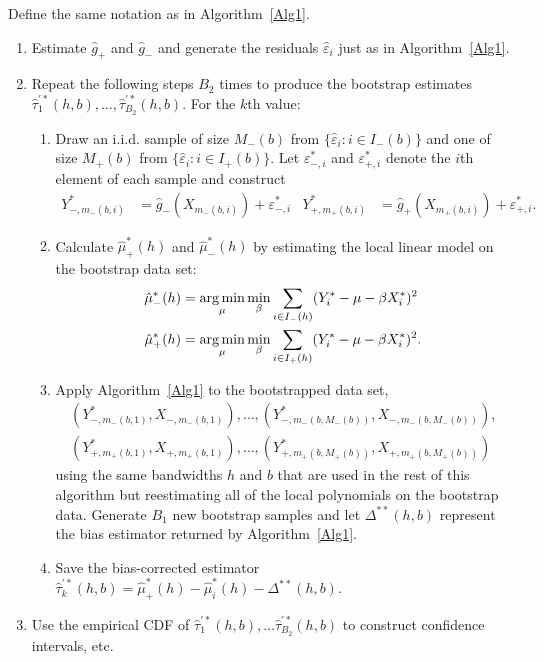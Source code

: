 \documentclass[12pt,fleqn]{article}
\begin{document}
\begin{algorithm}\label{Alg2}
  Define the same notation as in Algorithm~\ref{Alg1}.
  \begin{enumerate}
  \item Estimate $\hat{g}_{+}$ and $\hat{g}_{-}$ and generate the residuals
    $\hat\varepsilon_i$ just as in Algorithm~\ref{Alg1}.
  \item Repeat the following steps $B_{2}$ times to produce the
    bootstrap estimates
    $\hat\tau_1^{\prime*}(h,b), \dots, \hat\tau_{B_{2}}^{\prime*}(h,b)$. For the
    $k$th value:
    \begin{enumerate}
    \item Draw an i.i.d. sample of size $M_-(b)$ from
      $\{\hat\varepsilon_i : i \in I_-(b)\}$ and one of size $M_+(b)$ from
      $\{\hat\varepsilon_i : i \in I_+(b)\}$. Let $\varepsilon_{-,i}^{*}$ and
      $\varepsilon_{+,i}^{*}$ denote the $i$th element of each sample and
      construct
      \begin{align*}
        Y_{-,m_-(b,i)}^* &= \hat g_-(X_{m_-(b,i)}) + \varepsilon_{-,i}^{*} &
        Y_{+,m_+(b,i)}^* &= \hat g_+(X_{m_{+}(b,i)}) + \varepsilon_{+,i}^{*}.
      \end{align*}
    \item Calculate $\hat\mu_+^*(h)$ and $\hat\mu_-^*(h)$ by estimating the
      local linear model on the bootstrap data set:
      \begin{align*}
        \hat\mu_-^*(h)
        &= \argmin_{\mu} \min_{\beta} \ssum[-]{i}{h}
          (Y_i^* - \mu - \beta X_i^*)^2 \\
        \hat\mu_+^*(h)
        &= \argmin_{\mu} \min_{\beta} \ssum[+]{i}{h}
          (Y_i^* - \mu - \beta X_i^*)^2.
      \end{align*}
    \item Apply Algorithm~\ref{Alg1} to the bootstrapped data set,
      \begin{multline*}
        (Y_{-,m_-(b,1)}^{*}, X_{-,m_-(b,1)}),\dots,
        (Y_{-,m_-(b,M_-(b))}^{*},X_{-,m_-(b,M_-(b))}), \\
        (Y_{+,m_+(b,1)}^{*}, X_{+,m_+(b,1)}),\dots,
        (Y_{+,m_+(b,M_+(b))}^{*},X_{+,m_+(b,M_+(b))})
      \end{multline*}
      using the same bandwidths $h$ and $b$ that are used in the rest of this
      algorithm but reestimating all of the local polynomials on the bootstrap
      data. Generate $B_1$ new bootstrap samples and let $\Delta^{**}(h,b)$
      represent the bias estimator returned by Algorithm~\ref{Alg1}.
    \item Save the bias-corrected estimator
      $\hat\tau_k^{\prime*}(h,b) = \hat\mu_+^*(h) - \hat\mu_i^*(h)
      - \Delta^{**}(h,b)$.
    \end{enumerate}
  \item Use the empirical CDF of
    $\hat\tau_1^{\prime*}(h,b),\dots \hat\tau_{B_2}^{\prime*}(h,b)$ to
    construct confidence intervals, etc.
  \end{enumerate}
\end{algorithm}
\end{document}
